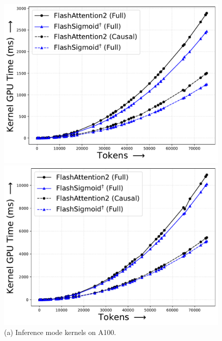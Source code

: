 \begin{figure}[!htbp]
    \centering
    \begin{minipage}{0.46\textwidth}
        \footnotesize
        \centering
        \includegraphics[trim={0 0 0 0}, width=\textwidth]{figures/_flash_figures/final_arxiv/f5/A100_noalibi_FWD_Full_14.82_0.08_Causal_18.02_0.05.pdf}
        \captionsetup{justification=centering}
        \caption*{
            (a) Inference mode kernels on A100.
        }
    \end{minipage}
    \hfill
    \begin{minipage}{0.46\textwidth}
        \centering        
        \includegraphics[trim={0 0 0 0}, width=\textwidth]{figures/_flash_figures/final_arxiv/f5/A100_noalibi_FWDBWD_Full_6.18_0.05_Causal_5.76_0.04.pdf}

\end{minipage}
\end{figure}
